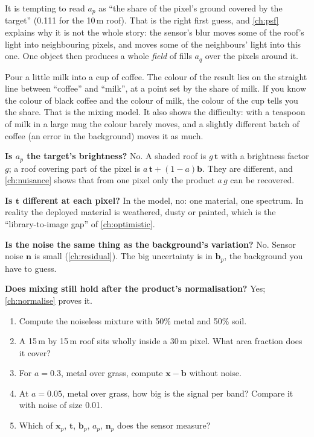 \documentclass[11pt,a4paper,oneside,openany]{book}
\newcommand{\B}[1]{{\symbf{#1}}}
\newcommand{\B}[1]{{\bm{#1}}}
\newcommand{\vx}{\B{x}}
\newcommand{\vt}{\B{t}}
\newcommand{\vb}{\B{b}}
\newcommand{\vn}{\B{n}}
\begin{document}
It is tempting to read $a_p$ as ``the share of the pixel's ground covered by the target'' (0.111 for the 10\,m roof). That is the
right first guess, and \cref{ch:psf} explains why it is not the whole story: the sensor's blur moves some of the roof's light into
neighbouring pixels, and moves some of the neighbours' light into this one. One object then produces a whole \emph{field} of fills
$a_q$ over the pixels around it.

\begin{analogy}
Pour a little milk into a cup of coffee. The colour of the result lies on the straight line between ``coffee'' and ``milk'', at
a point set by the share of milk. If you know the colour of black coffee and the colour of milk, the colour of the cup tells you
the share. That is the mixing model. It also shows the difficulty: with a teaspoon of milk in a large mug the colour barely
moves, and a slightly different batch of coffee (an error in the background) moves it as much.
\end{analogy}

\begin{confusions}
\textbf{Is $a_p$ the target's brightness?} No. A shaded roof is $g\,\vt$ with a brightness factor $g$; a roof covering part of the
pixel is $a\,\vt+(1-a)\vb$. They are different, and \cref{ch:nuisance} shows that from one pixel only the product $a\,g$ can be
recovered.

\textbf{Is $\vt$ different at each pixel?} In the model, no: one material, one spectrum. In reality the deployed material is
weathered, dusty or painted, which is the ``library-to-image gap'' of \cref{ch:optimistic}.

\textbf{Is the noise the same thing as the background's variation?} No. Sensor noise $\vn$ is small (\cref{ch:residual}). The big
uncertainty is in $\vb_p$, the background you have to guess.

\textbf{Does mixing still hold after the product's normalisation?} Yes; \cref{ch:normalise} proves it.
\end{confusions}

\begin{checkyourself}
\begin{enumerate}
\item Compute the noiseless mixture with 50\% metal and 50\% soil.
\item A 15\,m by 15\,m roof sits wholly inside a 30\,m pixel. What area fraction does it cover?
\item For $a=0.3$, metal over grass, compute $\vx-\vb$ without noise.
\item At $a=0.05$, metal over grass, how big is the signal per band? Compare it with noise of size 0.01.
\item Which of $\vx_p$, $\vt$, $\vb_p$, $a_p$, $\vn_p$ does the sensor measure?
\end{enumerate}
\end{checkyourself}
\end{document}
